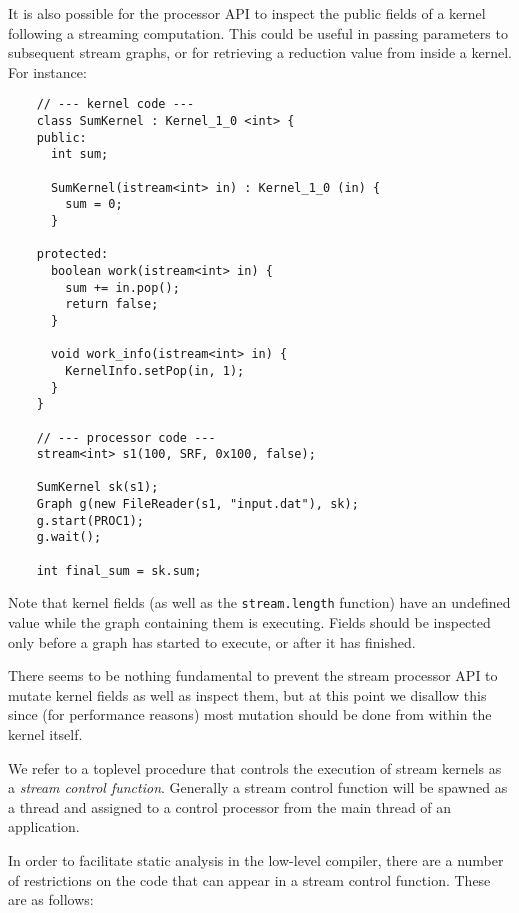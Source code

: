 It is also possible for the processor API to inspect the public
fields of a kernel following a streaming computation.  This could be
useful in passing parameters to subsequent stream graphs, or for
retrieving a reduction value from inside a kernel.  For instance:
{\small
\begin{verbatim}
    // --- kernel code ---
    class SumKernel : Kernel_1_0 <int> {
    public:
      int sum;

      SumKernel(istream<int> in) : Kernel_1_0 (in) {
        sum = 0;
      }

    protected:
      boolean work(istream<int> in) {
        sum += in.pop();
        return false;
      }

      void work_info(istream<int> in) {
        KernelInfo.setPop(in, 1);
      }
    }

    // --- processor code ---
    stream<int> s1(100, SRF, 0x100, false);

    SumKernel sk(s1);
    Graph g(new FileReader(s1, "input.dat"), sk);
    g.start(PROC1);
    g.wait();

    int final_sum = sk.sum;
\end{verbatim}}

Note that kernel fields (as well as the {\tt stream.length} function)
have an undefined value while the graph containing them is executing.
Fields should be inspected only before a graph has started to execute,
or after it has finished.

There seems to be nothing fundamental to prevent the stream processor
API to mutate kernel fields as well as inspect them, but at this point
we disallow this since (for performance reasons) most mutation should
be done from within the kernel itself.


We refer to a toplevel procedure that controls the execution of stream
kernels as a {\it stream control function}.  Generally a stream
control function will be spawned as a thread and assigned to a control
processor from the main thread of an application.

In order to facilitate static analysis in the low-level compiler,
there are a number of restrictions on the code that can appear in a
stream control function.  These are as follows:

